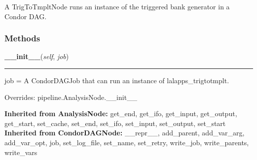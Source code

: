 A TrigToTmpltNode runs an instance of the triggered bank generator in a 
Condor DAG.



  \subsubsection{Methods}

    \label{inspiral:TrigToTmpltNode:__init__}
    \vspace{0.5ex}

    \noindent\begin{boxedminipage}{\textwidth}

    \raggedright \textbf{\_\_init\_\_}(\textit{self}, \textit{job})

    \vspace{-1.5ex}

    \rule{\textwidth}{0.5\fboxrule}
    job = A CondorDAGJob that can run an instance of 
    lalapps\_trigtotmplt.

    \vspace{1ex}

      Overrides: pipeline.AnalysisNode.\_\_init\_\_

    \end{boxedminipage}

  \noindent\textbf{Inherited from AnalysisNode:}
    get\_end,
    get\_ifo,
    get\_input,
    get\_output,
    get\_start,
    set\_cache,
    set\_end,
    set\_ifo,
    set\_input,
    set\_output,
    set\_start
    \\
  \noindent\textbf{Inherited from CondorDAGNode:}
    \_\_repr\_\_,
    add\_parent,
    add\_var\_arg,
    add\_var\_opt,
    job,
    set\_log\_file,
    set\_name,
    set\_retry,
    write\_job,
    write\_parents,
    write\_vars
